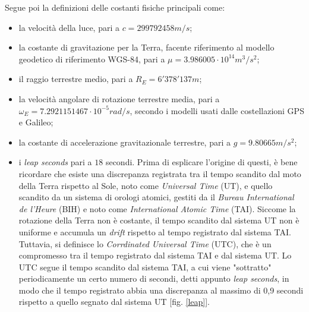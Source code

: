 \documentclass[a4paper,11pt,twoside]{book}
\begin{document}
	Segue poi la definizioni delle costanti fisiche principali come:
	
	\begin{itemize}[-]
		\item la velocità della luce, pari a $c = 299792458 m/s$;
		
		\item la costante di gravitazione per la Terra, facente riferimento al modello geodetico di riferimento WGS-84, pari a $\mu = 3.986005 \cdot 10 ^{14}m^3/s^2$;
		
		\item il raggio terrestre medio, pari a $R_E = 6'378'137m$;
		
		\item la velocità angolare di rotazione terrestre media, pari a $\omega_E = 7.2921151467 \cdot 10^{-5} rad/s$, secondo i modelli usati dalle costellazioni GPS e Galileo;
		
		\item la costante di accelerazione gravitazionale terrestre, pari a $g = 9.80665m/s^2$;
		
		\item i \textit{leap seconds} pari a $18$ secondi. Prima di esplicare l'origine di questi, è bene  ricordare che esiste una discrepanza registrata tra il tempo scandito dal moto della Terra rispetto al Sole, noto come \textit{Universal Time} (UT), e quello scandito da un sistema di orologi atomici, gestiti da il \textit{Bureau International de l'Heure} (BIH) e noto come \textit{International Atomic Time} (TAI). Siccome la rotazione della Terra non è costante, il tempo scandito dal sistema UT non è uniforme e accumula un \textit{drift} rispetto al tempo registrato dal sistema TAI. Tuttavia, si definisce lo \textit{Corrdinated Universal Time} (UTC), che è un compromesso tra il tempo registrato dal sistema TAI e dal sistema UT. Lo UTC segue il tempo scandito dal sistema TAI, a cui viene "sottratto" periodicamente un certo numero di secondi, detti appunto \textit{leap seconds}, in modo che il tempo registrato abbia una discrepanza al massimo di 0,9 secondi rispetto a quello segnato dal sistema UT [fig. \ref{leap}].
		

\end{itemize}
\end{document}
